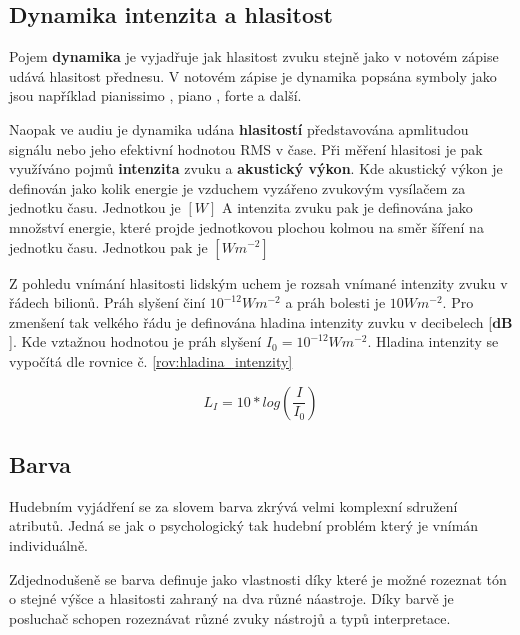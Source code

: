   \subsection{Dynamika intenzita a hlasitost} \label{sec:Frekvence}

  Pojem \textbf{dynamika} je vyjadřuje jak hlasitost  zvuku stejně jako v notovém zápise udává hlasitost  přednesu.
  V notovém zápise je dynamika popsána symboly jako jsou například pianissimo , piano , forte  a další.

  Naopak ve audiu je dynamika udána \textbf{hlasitostí } představována apmlitudou signálu nebo jeho efektivní hodnotou \acs{RMS} v čase.
  Při měření hlasitosi je pak využíváno pojmů \textbf{intenzita} zvuku a \textbf{akustický výkon}.
  Kde akustický výkon je definován jako kolik energie je vzduchem vyzářeno zvukovým vysílačem za jednotku času. Jednotkou je $[W]$
  A intenzita zvuku pak je definována jako množství energie, které projde jednotkovou plochou kolmou na směr šíření na jednotku času. Jednotkou pak je $[Wm^{-2}]$ \cite{intenzita_zvuku_definice}
  
  Z pohledu vnímání hlasitosti lidským uchem je rozsah vnímané intenzity zvuku v řádech bilionů. Práh slyšení činí $10^{-12} Wm^{-2}$ a práh bolesti je $10 Wm^{-2}$.
  Pro zmenšení tak velkého řádu je definována hladina intenzity zuvku v decibelech [$\textbf{dB}$]. Kde vztažnou hodnotou je práh slyšení $I_0 = 10^{-12} Wm^{-2}$.
  Hladina intenzity se vypočítá dle rovnice č. \ref*{rov:hladina_intenzity}

  \begin{equation}
    L_I = 10*log(\frac{I}{I_0})
    \label{rov:hladina_intenzity}
  \end{equation}

  \subsection{Barva} \label{sec:Barva}

  Hudebním vyjádření se za slovem barva zkrývá velmi komplexní sdružení atributů.
  Jedná se jak o psychologický tak hudební problém který je vnímán individuálně.
  \cite{The_perception_of_musical_timbre}

  Zdjednodušeně se barva definuje jako vlastnosti díky které je možné rozeznat tón o stejné výšce a hlasitosti zahraný na dva různé náastroje.
  Díky barvě je posluchač schopen rozeznávat různé zvuky nástrojů a typů interpretace.

